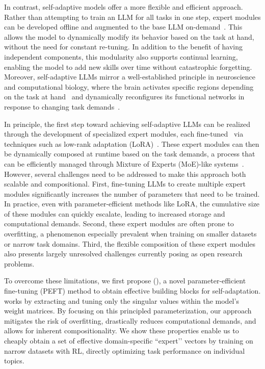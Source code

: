 In contrast, self-adaptive models offer a more flexible and efficient approach.
Rather than attempting to train an LLM for all tasks in one step, expert modules can be developed offline and augmented to the base LLM on-demand~\citep{kang2024self}.
This allows the model to dynamically modify its behavior based on the task at hand, without the need for constant re-tuning.
In addition to the benefit of having independent components, this modularity also supports continual learning, enabling the model to add new skills over time without catastrophic forgetting.
Moreover, self-adaptive LLMs mirror a well-established principle in neuroscience and computational biology, where the brain activates specific regions depending on the task at hand~\citep{loose2017switch} and dynamically reconfigures its functional networks in response to changing task demands~\citep{davison2015brain}.

In principle, the first step toward achieving self-adaptive LLMs can be realized through the development of specialized expert modules, each fine-tuned~\citep{kaplan2020scaling} via techniques such as low-rank adaptation (LoRA)~\citep{hu2021lora}.
These expert modules can then be dynamically composed at runtime based on the task demands, a process that can be efficiently managed through Mixture of Experts (MoE)-like systems~\citep{ICML2024_MoE}.
However, several challenges need to be addressed to make this approach both scalable and compositional.
First, fine-tuning LLMs to create multiple expert modules significantly increases the number of parameters that need to be trained.
In practice, even with parameter-efficient methods like LoRA, the cumulative size of these modules can quickly escalate, leading to increased storage and computational demands.
Second, these expert modules are often prone to overfitting, a phenomenon especially prevalent when training on smaller datasets or narrow task domains.
Third, the flexible composition of these expert modules also presents largely unresolved challenges currently posing as open research problems. 

To overcome these limitations, we first propose \svdname (\svdacro), a novel parameter-efficient fine-tuning (PEFT) method to obtain effective building blocks for self-adaptation.
\svdacro works by extracting and tuning only the singular values within the model's weight matrices.
By focusing on this principled parameterization, our approach mitigates the risk of overfitting, drastically reduces computational demands, and allows for inherent compositionality.
We show these properties enable us to cheaply obtain a set of effective domain-specific ``expert’’ vectors by training on narrow datasets with RL, directly optimizing task performance on individual topics.

